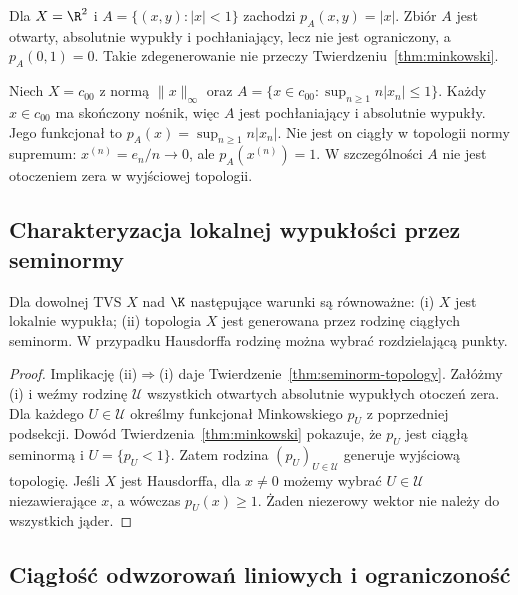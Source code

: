 \begin{przyklad}
Dla $X=\R^2$ i $A=\{(x,y):|x|<1\}$ zachodzi
$p_A(x,y)=|x|$. Zbiór $A$ jest otwarty, absolutnie
wypukły i pochłaniający, lecz nie jest ograniczony,
a $p_A(0,1)=0$. Takie zdegenerowanie nie przeczy
Twierdzeniu~\ref{thm:minkowski}.
\end{przyklad}

\begin{przyklad}
Niech $X=c_{00}$ z normą $\|x\|_\infty$ oraz
$A=\{x\in c_{00}:\sup_{n\ge1}n|x_n|\le1\}$.
Każdy $x\in c_{00}$ ma skończony nośnik, więc $A$
jest pochłaniający i absolutnie wypukły. Jego funkcjonał
to $p_A(x)=\sup_{n\ge1}n|x_n|$. Nie jest on ciągły
w topologii normy supremum: $x^{(n)}=e_n/n\to0$,
ale $p_A(x^{(n)})=1$. W szczególności $A$ nie jest
otoczeniem zera w wyjściowej topologii.
\end{przyklad}

\subsection{Charakteryzacja lokalnej wypukłości przez seminormy}

\begin{twierdzenie}
\label{thm:lcs-seminorms}
Dla dowolnej TVS $X$ nad $\K$ następujące warunki są
równoważne: (i) $X$ jest lokalnie wypukła;
(ii) topologia $X$ jest generowana przez rodzinę
ciągłych seminorm. W przypadku Hausdorffa rodzinę
można wybrać rozdzielającą punkty.
\end{twierdzenie}
\begin{proof}
Implikację (ii)$\Rightarrow$(i) daje
Twierdzenie~\ref{thm:seminorm-topology}.
Załóżmy (i) i weźmy rodzinę $\mathcal U$ wszystkich
otwartych absolutnie wypukłych otoczeń zera.
Dla każdego $U\in\mathcal U$ określmy funkcjonał
Minkowskiego $p_U$ z poprzedniej podsekcji. Dowód
Twierdzenia~\ref{thm:minkowski} pokazuje, że $p_U$
jest ciągłą seminormą i $U=\{p_U<1\}$. Zatem
rodzina $(p_U)_{U\in\mathcal U}$ generuje wyjściową
topologię. Jeśli $X$ jest Hausdorffa, dla $x\ne0$
możemy wybrać $U\in\mathcal U$ niezawierające $x$,
a wówczas $p_U(x)\ge1$. Żaden niezerowy wektor
nie należy do wszystkich jąder.
\end{proof}


\subsection{Ciągłość odwzorowań liniowych i ograniczoność}


